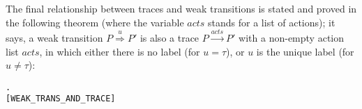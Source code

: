 The final relationship between traces and weak transitions is stated
and proved in the following theorem
(where the  variable $acts$ stands for
a list of actions); 
it says, a weak transition $P\overset{u}{\Rightarrow}P'$ is also a
trace $P\overset{acts}{\longrightarrow}P'$ with a
 non-empty action list $acts$, in which either there is no label (for $u = \tau$), or 
$u$ is the unique label (for $u \neq \tau$):
\begin{alltt}
\HOLTokenTurnstile{}  \HOLTokenWeakTransBegin{}\HOLTokenWeakTransEnd {} \HOLSymConst{\HOLTokenEquiv{}}
   \HOLSymConst{\HOLTokenExists{}}.
           \HOLSymConst{\HOLTokenConj{}} \HOLSymConst{\HOLTokenNeg{}}  \HOLSymConst{\HOLTokenConj{}}
         \HOLSymConst{\ensuremath{=}} \HOLSymConst{\ensuremath{\tau}}       \hfill{[WEAK_TRANS_AND_TRACE]}
\end{alltt}

